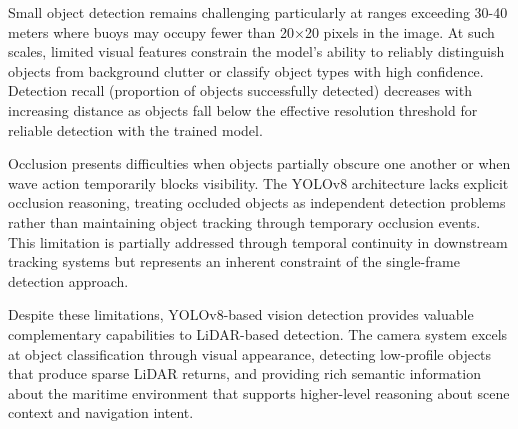 Small object detection remains challenging particularly at ranges exceeding 30-40 meters where buoys may occupy fewer than 20×20 pixels in the image.
At such scales, limited visual features constrain the model's ability to reliably distinguish objects from background clutter or classify object types with high confidence.
Detection recall (proportion of objects successfully detected) decreases with increasing distance as objects fall below the effective resolution threshold for reliable detection with the trained model.

Occlusion presents difficulties when objects partially obscure one another or when wave action temporarily blocks visibility.
The YOLOv8 architecture lacks explicit occlusion reasoning, treating occluded objects as independent detection problems rather than maintaining object tracking through temporary occlusion events.
This limitation is partially addressed through temporal continuity in downstream tracking systems but represents an inherent constraint of the single-frame detection approach.

Despite these limitations, YOLOv8-based vision detection provides valuable complementary capabilities to \ac{LiDAR}-based detection.
The camera system excels at object classification through visual appearance, detecting low-profile objects that produce sparse \ac{LiDAR} returns, and providing rich semantic information about the maritime environment that supports higher-level reasoning about scene context and navigation intent.









